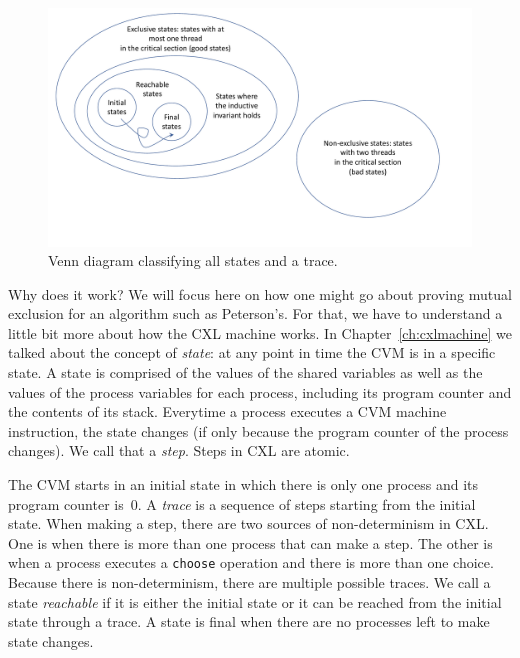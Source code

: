 \documentclass{report}
\begin{document}
\begin{figure}
\begin{center}
\includegraphics[width=6in]{figures/states-crop.pdf}
\end{center}
\caption{Venn diagram classifying all states and a trace.}
\label{fig:states}
\end{figure}


Why does it work?  We will focus here on how one might go about proving
mutual exclusion for an algorithm such as Peterson's.
For that, we have to understand a little bit more about how the CXL
machine works.
In Chapter~\ref{ch:cxlmachine} we talked about the concept of \emph{state}:
at any point in time the CVM is in a specific state.
A state is comprised of the values of the shared variables as well as
the values of the process variables
for each process, including its
program counter and the contents of its stack.
Everytime a process executes a CVM machine instruction, the
state changes (if only because the program counter of the process
changes).  We call that a \emph{step}.
Steps in CXL are atomic.


The CVM starts in an initial state in which there is only
one process and its program counter is~0.  A \emph{trace}
is a sequence of steps starting from the initial state.
When making a step, there are two sources of non-determinism
in CXL.
One is when
there is more than one process that can make a step.  The other is
when a process executes a \texttt{choose} operation and there is
more than one choice.
Because there is non-determinism, there are multiple possible traces.
We call a state \emph{reachable}
if it is either the initial state
or it can be reached from the initial state through a trace.
A state is final
when there are no processes left to make state changes.
\end{document}
